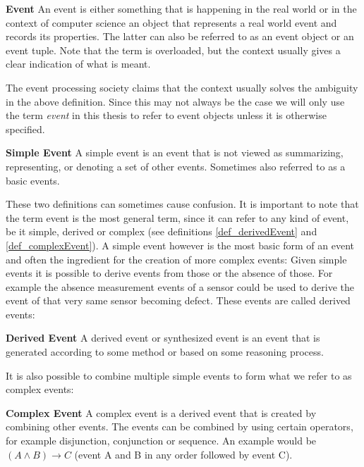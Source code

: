 \begin{mydef}
\textbf{Event} An event is either something that is happening in the real world or in the context of computer science an object that represents a real world event and records its properties. The latter can also be referred to as an event object or an event tuple. Note that the term is overloaded, but the context usually gives a clear indication of what is meant.
\end{mydef}

The event processing society claims that the context usually solves the ambiguity in the above definition. Since this may not always be the case we will only use the term \textit{event} in this thesis to refer to event objects unless it is otherwise specified.

\begin{mydef}
\textbf{Simple Event} A simple event is an event that is not viewed as summarizing, representing, or denoting a set of other events. Sometimes also referred to as a basic events.
\end{mydef}

These two definitions can sometimes cause confusion. It is important to note that the term event is the most general term, since it can refer to any kind of event, be it simple, derived or complex (see definitions \ref{def_derivedEvent} and \ref{def_complexEvent}). A simple event however is the most basic form of an event and often the ingredient for the creation of more complex events:
Given simple events it is possible to derive events from those or the absence of those. For example the absence measurement events of a sensor could be used to derive the event of that very same sensor becoming defect. These events are called derived events:

\begin{mydef}
\label{def_derivedEvent}
\textbf{Derived Event} A derived event or synthesized event is an event that is generated according to some method or based on some reasoning process.
\end{mydef}

It is also possible to combine multiple simple events to form what we refer to as complex events:

\begin{mydef}
\label{def_complexEvent}
\textbf{Complex Event} A complex event is a derived event that is created by combining other events. The events can be combined by using certain operators, for example disjunction, conjunction or sequence. An example would be $(A \land B) \rightarrow C$ (event A and B in any order followed by event C).
\end{mydef}

